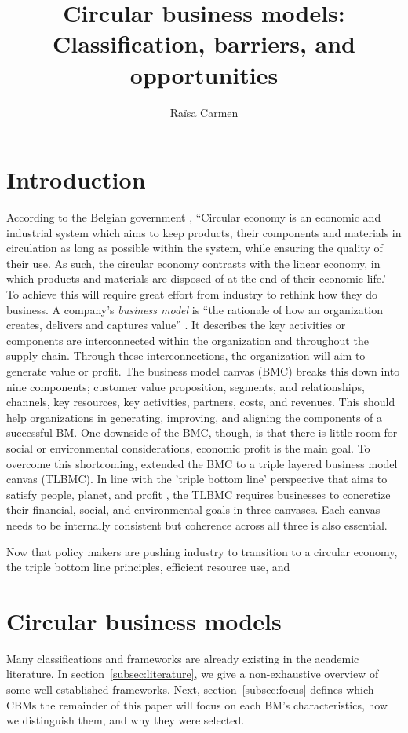 \documentclass[a4paper,man,10pt]{apa6}
\title{Circular business models: Classification, barriers, and opportunities}
\author{Ra\"{i}sa Carmen}
\affiliation{KU Leuven, Campus Brussels}
\begin{document}
\renewcommand{\baselinestretch}{1}
\maketitle

\section{Introduction}\label{sec:Introduction}
According to the Belgian government \citep{Belgium.be2018}, ``Circular economy is an economic and industrial system which aims to keep products, their components and materials in circulation as long as possible within the system, while ensuring the quality of their use. As such, the circular economy contrasts with the linear economy, in which products and materials are disposed of at the end of their economic life.' To achieve this will require great effort from industry to rethink how they do business. A company's \emph{business model} is ``the rationale of how an organization
creates, delivers and captures value'' \citep[p.14]{osterwalder2010business}. It describes the key activities or components are interconnected within the organization and throughout the supply chain. Through these interconnections, the organization will aim to generate value or profit. The business model canvas (BMC) breaks this down into nine components; customer value proposition, segments, and relationships, channels, key resources, key
activities, partners, costs, and revenues. This should help organizations in generating, improving, and aligning the components of a successful BM. One downside of the BMC, though, is that there is little room for social or environmental considerations, economic profit is the main goal. To overcome this shortcoming, 
\cite{JOYCE20161474} extended the BMC to a triple layered business model canvas (TLBMC). In line with the 'triple bottom line' perspective that aims to satisfy people, planet, and profit \citep{Elkington1998}, the TLBMC requires businesses to concretize their financial, social, and environmental goals in three canvases. Each canvas needs to be internally consistent but coherence across all three is also essential.

Now that policy makers are pushing industry to transition to a circular economy, the triple bottom line principles, efficient resource use, and 


\section{Circular business models}
\label{sec:CBS}
Many classifications and frameworks are already existing in the academic literature. In section~\ref{subsec:literature}, we give a non-exhaustive overview of some well-established frameworks. Next, section~\ref{subsec:focus} defines which CBMs the remainder of this paper will focus on each BM's characteristics, how we distinguish them, and why they were selected. 
\end{document}
